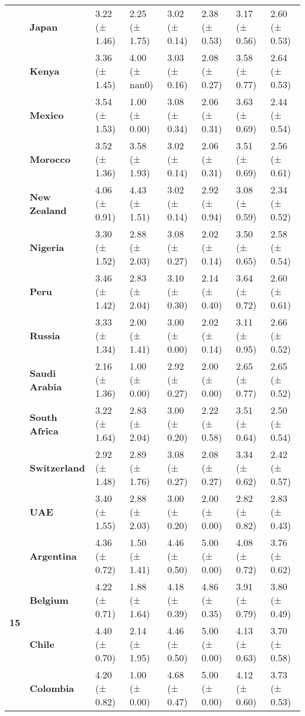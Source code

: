 \begin{tabular}{llllllll}
\textbf{} & \textbf{Japan} & 3.22 (± 1.46) & 2.25 (± 1.75) & 3.02 (± 0.14) & 2.38 (± 0.53) & 3.17 (± 0.56) & 2.60 (± 0.53) \\
\textbf{} & \textbf{Kenya} & 3.36 (± 1.45) & 4.00 (± nan0) & 3.03 (± 0.16) & 2.08 (± 0.27) & 3.58 (± 0.77) & 2.64 (± 0.53) \\
\textbf{} & \textbf{Mexico} & 3.54 (± 1.53) & 1.00 (± 0.00) & 3.08 (± 0.34) & 2.06 (± 0.31) & 3.63 (± 0.69) & 2.44 (± 0.54) \\
\textbf{} & \textbf{Morocco} & 3.52 (± 1.36) & 3.58 (± 1.93) & 3.02 (± 0.14) & 2.06 (± 0.31) & 3.51 (± 0.69) & 2.56 (± 0.61) \\
\textbf{} & \textbf{New Zealand} & 4.06 (± 0.91) & 4.43 (± 1.51) & 3.02 (± 0.14) & 2.92 (± 0.94) & 3.08 (± 0.59) & 2.34 (± 0.52) \\
\textbf{} & \textbf{Nigeria} & 3.30 (± 1.52) & 2.88 (± 2.03) & 3.08 (± 0.27) & 2.02 (± 0.14) & 3.50 (± 0.65) & 2.58 (± 0.54) \\
\textbf{} & \textbf{Peru} & 3.46 (± 1.42) & 2.83 (± 2.04) & 3.10 (± 0.30) & 2.14 (± 0.40) & 3.64 (± 0.72) & 2.60 (± 0.61) \\
\textbf{} & \textbf{Russia} & 3.33 (± 1.34) & 2.00 (± 1.41) & 3.00 (± 0.00) & 2.02 (± 0.14) & 3.11 (± 0.95) & 2.66 (± 0.52) \\
\textbf{} & \textbf{Saudi Arabia} & 2.16 (± 1.36) & 1.00 (± 0.00) & 2.92 (± 0.27) & 2.00 (± 0.00) & 2.65 (± 0.77) & 2.65 (± 0.52) \\
\textbf{} & \textbf{South Africa} & 3.22 (± 1.64) & 2.83 (± 2.04) & 3.00 (± 0.20) & 2.22 (± 0.58) & 3.51 (± 0.64) & 2.50 (± 0.54) \\
\textbf{} & \textbf{Switzerland} & 2.92 (± 1.48) & 2.89 (± 1.76) & 3.08 (± 0.27) & 2.08 (± 0.27) & 3.34 (± 0.62) & 2.42 (± 0.57) \\
\textbf{} & \textbf{UAE} & 3.40 (± 1.55) & 2.88 (± 2.03) & 3.00 (± 0.20) & 2.00 (± 0.00) & 2.82 (± 0.82) & 2.83 (± 0.43) \\
\cline{1-8}
\multirow[t]{19}{*}{\textbf{15}} & \textbf{Argentina} & 4.36 (± 0.72) & 1.50 (± 1.41) & 4.46 (± 0.50) & 5.00 (± 0.00) & 4.08 (± 0.72) & 3.76 (± 0.62) \\
\textbf{} & \textbf{Belgium} & 4.22 (± 0.71) & 1.88 (± 1.64) & 4.18 (± 0.39) & 4.86 (± 0.35) & 3.91 (± 0.79) & 3.80 (± 0.49) \\
\textbf{} & \textbf{Chile} & 4.40 (± 0.70) & 2.14 (± 1.95) & 4.46 (± 0.50) & 5.00 (± 0.00) & 4.13 (± 0.63) & 3.70 (± 0.58) \\
\textbf{} & \textbf{Colombia} & 4.20 (± 0.82) & 1.00 (± 0.00) & 4.68 (± 0.47) & 5.00 (± 0.00) & 4.12 (± 0.60) & 3.73 (± 0.53) \\

\end{tabular}
